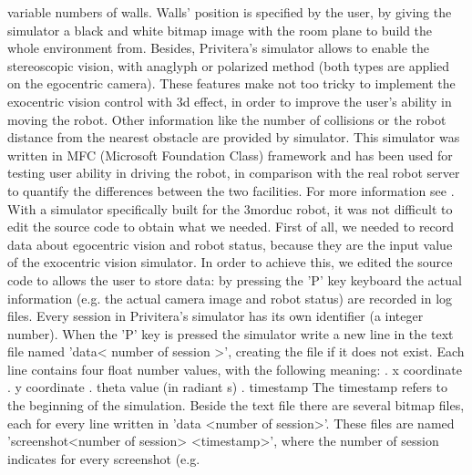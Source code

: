 variable numbers of walls. Walls' position is specified by the user, by giving the simulator a black and white bitmap image
with the room plane to build the whole environment from.
\newline Besides, Privitera's simulator allows to enable the stereoscopic vision, with anaglyph or polarized method (both 
types are applied on the egocentric camera). These features make not too tricky to implement the exocentric vision control with 3d
effect, in order to improve the user's ability in moving the robot. Other information like the number of collisions or the robot
distance from the nearest obstacle are provided by simulator.
\newline This simulator was written in MFC (Microsoft Foundation Class) framework and has been used for testing user ability in
driving the robot, in comparison with the real robot server to quantify the differences between the two facilities. For more
information see \cite{privitera}.
\newline With a simulator specifically built for the 3morduc robot, it was not difficult to edit the source code to obtain what we 
needed. First of all, we needed to record data about egocentric vision and robot status, because they are the input value 
of the exocentric vision simulator. In order to achieve this, we edited the source code to allows the user to store data: by
pressing the 'P' key keyboard the actual information (e.g. the actual camera image and robot status) are recorded in
log files.
\newline Every session in Privitera's simulator has its own identifier (a integer number). When the 'P' key is pressed the
simulator write a new line in the text file named 'data< number of session >', creating the file if it does not exist. Each
line contains four float number values, with the following meaning:
\newline
{}. x coordinate
. y coordinate
. theta value (in radiant s)
. timestamp
\newline 
\newline The timestamp refers to the beginning of the simulation.
\newline Beside the text file there are several bitmap files, each for every line written in 'data <number of session>'. These 
files are named 'screenshot<number of session> <timestamp>', where the number of session indicates for every screenshot (e.g.
